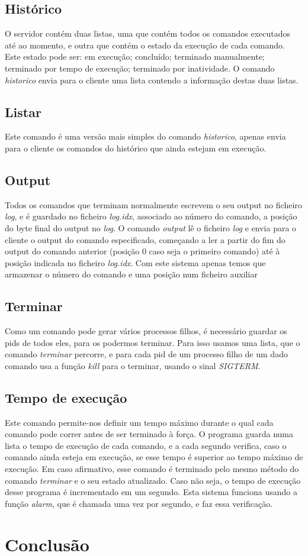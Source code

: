 \documentclass[a4paper]{report}
\begin{document}
	\section{Histórico}
	O servidor contém duas listas, uma que contém todos os comandos executados até ao momento, e outra que contém o estado da execução de cada comando. Este estado pode ser: em execução; concluído; terminado manualmente; terminado por tempo de execução; terminado por inatividade. O comando \emph{historico} envia para o cliente uma lista contendo a informação destas duas listas.
	
	\section{Listar}
	Este comando é uma versão mais simples do comando \emph{historico}, apenas envia para o cliente os comandos do histórico que ainda estejam em execução.
	
	\section{Output}
	Todos os comandos que terminam normalmente escrevem o seu output no ficheiro \emph{log}, e é guardado no ficheiro \emph{log.idx}, associado ao número do comando, a posição do byte final do output no \emph{log}. O comando \emph{output} lê o ficheiro \emph{log} e envia para o cliente o output do comando especificado, começando a ler a partir do fim do output do comando anterior (posição 0 caso seja o primeiro comando) até à posição indicada no ficheiro \emph{log.idx}. Com este sistema apenas temos que armazenar o número do comando e uma posição num ficheiro auxiliar
	
	\section{Terminar}
	Como um comando pode gerar vários processos filhos, é necessário guardar os pids de todos eles, para os podermos terminar. Para isso usamos uma lista, que o comando \emph{terminar} percorre, e para cada pid de um processo filho de um dado comando usa a função \emph{kill} para o terminar, usando o sinal \emph{SIGTERM}.
	
	\section{Tempo de execução}
	Este comando permite-nos definir um tempo máximo durante o qual cada comando pode correr antes de ser terminado à força. O programa guarda numa lista o tempo de execução de cada comando, e a cada segundo verifica, caso o comando ainda esteja em execução, se esse tempo é superior ao tempo máximo de execução. Em caso afirmativo, esse comando é terminado pelo mesmo método do comando \emph{terminar} e o seu estado atualizado. Caso não seja, o tempo de execução desse programa é incrementado em um segundo. Esta sistema funciona usando a função \emph{alarm}, que é chamada uma vez por segundo, e faz essa verificação.
		
	

	\chapter{Conclusão}
\end{document}

